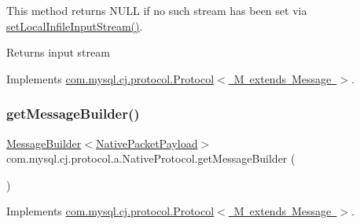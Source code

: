 This method returns N\+U\+LL if no such stream has been set via \mbox{\hyperlink{classcom_1_1mysql_1_1cj_1_1protocol_1_1a_1_1_native_protocol_a366f28e9d5a564e582932d16ce9d778f}{set\+Local\+Infile\+Input\+Stream()}}.

\begin{DoxyReturn}{Returns}
input stream 
\end{DoxyReturn}


Implements \mbox{\hyperlink{interfacecom_1_1mysql_1_1cj_1_1protocol_1_1_protocol_a14849c71b76edabc8dae60d7c22d9fee}{com.\+mysql.\+cj.\+protocol.\+Protocol$<$ M extends Message $>$}}.

\mbox{\label{classcom_1_1mysql_1_1cj_1_1protocol_1_1a_1_1_native_protocol_abded3c4e676d3558746c88ee5d206dda}} 
\subsubsection{\texorpdfstring{get\+Message\+Builder()}{getMessageBuilder()}}
{\footnotesize\ttfamily \mbox{\hyperlink{interfacecom_1_1mysql_1_1cj_1_1_message_builder}{Message\+Builder}}$<$\mbox{\hyperlink{classcom_1_1mysql_1_1cj_1_1protocol_1_1a_1_1_native_packet_payload}{Native\+Packet\+Payload}}$>$ com.\+mysql.\+cj.\+protocol.\+a.\+Native\+Protocol.\+get\+Message\+Builder (\begin{DoxyParamCaption}{ }\end{DoxyParamCaption})}



Implements \mbox{\hyperlink{interfacecom_1_1mysql_1_1cj_1_1protocol_1_1_protocol_a6a924ac14232063c3eab7b70a376ab29}{com.\+mysql.\+cj.\+protocol.\+Protocol$<$ M extends Message $>$}}.

\mbox{\label{classcom_1_1mysql_1_1cj_1_1protocol_1_1a_1_1_native_protocol_a3f99cc50263379785978172b329dde39}} 
